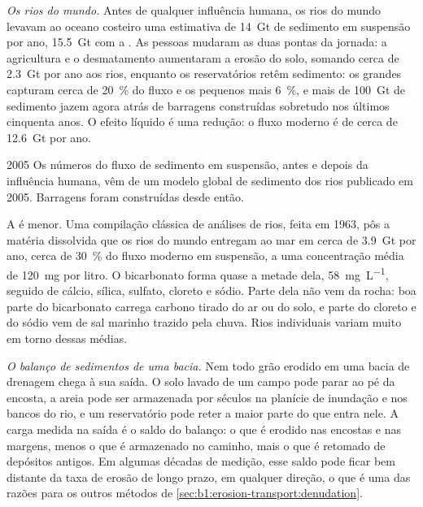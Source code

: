 \emph{Os rios do mundo.} Antes de qualquer influência humana, os rios do mundo levavam ao oceano costeiro uma estimativa de \qty{14}{Gt} de sedimento em suspensão por ano, \qty{15.5}{Gt} com a . As pessoas mudaram as duas pontas da jornada: a agricultura e o desmatamento aumentaram a erosão do solo, somando cerca de \qty{2.3}{Gt} por ano aos rios, enquanto os reservatórios retêm sedimento: os grandes capturam cerca de \qty{20}{\percent} do fluxo e os pequenos mais \qty{6}{\percent}, e mais de \qty{100}{Gt} de sedimento jazem agora atrás de barragens construídas sobretudo nos últimos cinquenta anos. O efeito líquido é uma redução: o fluxo moderno é de cerca de \qty{12.6}{Gt} por ano.

\begin{dated}{2005}
Os números do fluxo de sedimento em suspensão, antes e depois da influência humana, vêm de um modelo global de sedimento dos rios publicado em 2005. Barragens foram construídas desde então.
\end{dated}

A  é menor. Uma compilação clássica de análises de rios, feita em 1963, pôs a matéria dissolvida que os rios do mundo entregam ao mar em cerca de \qty{3.9}{Gt} por ano, cerca de \qty{30}{\percent} do fluxo moderno em suspensão, a uma concentração média de \qty{120}{mg} por litro. O bicarbonato forma quase a metade dela, \qty{58}{mg.L^{-1}}, seguido de cálcio, sílica, sulfato, cloreto e sódio. Parte dela não vem da rocha: boa parte do bicarbonato carrega carbono tirado do ar ou do solo, e parte do cloreto e do sódio vem de sal marinho trazido pela chuva. Rios individuais variam muito em torno dessas médias.

\emph{O balanço de sedimentos de uma bacia.} Nem todo grão erodido em uma bacia de drenagem chega à sua saída. O solo lavado de um campo pode parar ao pé da encosta, a areia pode ser armazenada por séculos na planície de inundação e nos bancos do rio, e um reservatório pode reter a maior parte do que entra nele. A carga medida na saída é o saldo do balanço: o que é erodido nas encostas e nas margens, menos o que é armazenado no caminho, mais o que é retomado de depósitos antigos. Em algumas décadas de medição, esse saldo pode ficar bem distante da taxa de erosão de longo prazo, em qualquer direção, o que é uma das razões para os outros métodos de \cref{sec:b1:erosion-transport:denudation}.

